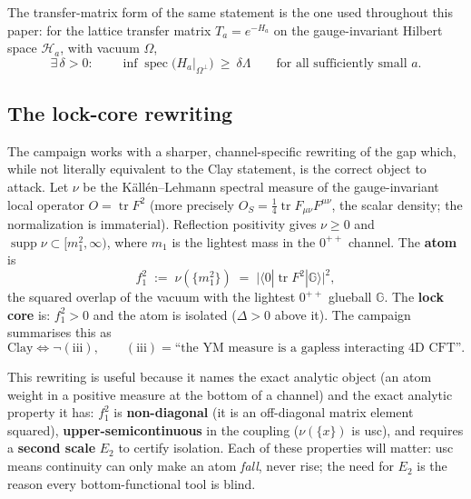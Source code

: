 The transfer-matrix form of the same statement is the one used throughout this paper: for the
lattice transfer matrix $T_a=e^{-H_a}$ on the gauge-invariant Hilbert space $\mathcal{H}_a$,
with vacuum $\Omega$,
\begin{equation}
\exists\,\delta>0:\qquad
\inf\operatorname{spec}\!\bigl(H_a\big|_{\Omega^\perp}\bigr)\ \ge\ \delta\Lambda
\qquad\text{for all sufficiently small } a .
\label{eq:clay-transfer}
\end{equation}

\subsection{The lock-core rewriting}

The campaign works with a sharper, channel-specific rewriting of the gap which, while not
literally equivalent to the Clay statement, is the correct object to attack. Let $\nu$ be the
Källén--Lehmann spectral measure of the gauge-invariant local operator
$O=\operatorname{tr}F^2$ (more precisely $O_S=\tfrac14\operatorname{tr}F_{\mu\nu}F^{\mu\nu}$,
the scalar density; the normalization is immaterial). Reflection positivity gives $\nu\ge0$
and $\operatorname{supp}\nu\subset[m_1^2,\infty)$, where $m_1$ is the lightest mass in the
$0^{++}$ channel. The \textbf{atom} is
\begin{equation}
f_1^2 \;:=\; \nu(\{m_1^2\}) \;=\; \bigl|\langle 0|\operatorname{tr}F^2|\mathbb{G}\rangle\bigr|^2 ,
\label{eq:atom}
\end{equation}
the squared overlap of the vacuum with the lightest $0^{++}$ glueball $\mathbb{G}$. The \textbf{lock core}
is: $f_1^2>0$ and the atom is isolated ($\Delta>0$ above it). The campaign summarises this as
\begin{equation}
\text{Clay}\iff\neg(\mathrm{iii}),\qquad
(\mathrm{iii})=\text{``the YM measure is a gapless interacting 4D CFT''.}
\label{eq:lockcore}
\end{equation}

This rewriting is useful because it names the exact analytic object (an atom weight in a
positive measure at the bottom of a channel) and the exact analytic property it has: $f_1^2$ is
\textbf{non-diagonal} (it is an off-diagonal matrix element squared),
\textbf{upper-semicontinuous} in the coupling ($\nu(\{x\})$ is usc), and requires a
\textbf{second scale} $E_2$ to certify isolation. Each of these properties will matter: usc
means continuity can only make an atom \emph{fall}, never rise; the need for $E_2$ is the
reason every bottom-functional tool is blind.


